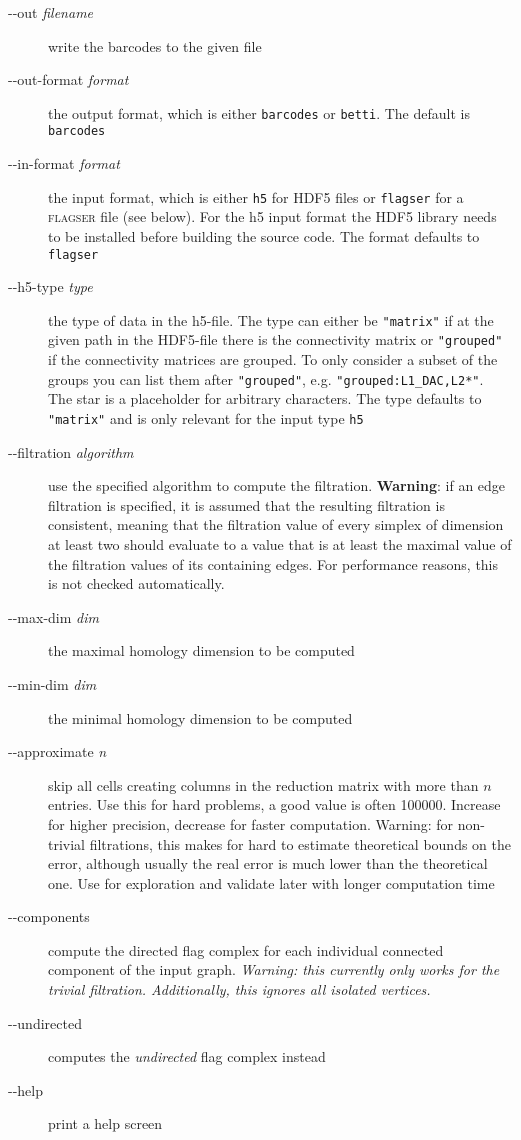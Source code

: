\documentclass{amsart}
\theoremstyle{definition}
\begin{document}
\enlargethispage{\baselineskip}
\begin{description}
  \item [-{}-out \textit{filename}] write the barcodes to the given file
  \item [-{}-out-format \textit{format}] the output format, which is either \texttt{barcodes} or
    \texttt{betti}. The default is \texttt{barcodes}
  \item [-{}-in-format \textit{format}] the input format, which is either \texttt{h5} for HDF5 files
    or \texttt{flagser} for a \textsc{flagser} file (see below). For the h5 input format the HDF5
    library needs to be installed before building the source code. The format defaults to
    \texttt{flagser}
  \item [-{}-h5-type \textit{type}] the type of data in the h5-file. The type can either be
    \texttt{"matrix"} if at the given path in the HDF5-file there is the connectivity matrix or \texttt{"grouped"}
    if the connectivity matrices are grouped. To only consider a subset of the groups you can list
    them after \texttt{"grouped"}, e.g. \texttt{"grouped:L1\_DAC,L2*"}. The star is a placeholder for
    arbitrary characters. The type defaults to \texttt{"matrix"} and is only relevant for the input
    type \texttt{h5}
  \item [-{}-filtration \textit{algorithm}] use the specified algorithm to compute the filtration. \textbf{Warning}:
  if an edge filtration is specified, it is assumed that the resulting filtration is consistent, meaning that the
  filtration value of every simplex of dimension at least two should evaluate to a value that is at least the
  maximal value of the filtration values of its containing edges. For performance reasons, this is not checked
  automatically.
  \item [-{}-max-dim \textit{dim}] the maximal homology dimension to be computed
  \item [-{}-min-dim \textit{dim}] the minimal homology dimension to be computed
  \item [-{}-approximate \textit{n}] skip all cells creating columns in the reduction matrix with
    more than $n$ entries. Use this for hard problems, a good value is often 100000. Increase for
    higher precision, decrease for faster computation. Warning: for non-trivial filtrations, this
    makes for hard to estimate theoretical bounds on the error, although usually the real error is
    much lower than the theoretical one. Use for exploration and validate later with longer computation
    time
  \item [-{}-components] compute the directed flag complex for each individual connected
    component of the input graph. \emph{Warning: this currently only works for the trivial
    filtration. Additionally, this ignores all isolated vertices.}
  \item [-{}-undirected] computes the \emph{undirected} flag complex instead
  \item [-{}-help] print a help screen
\end{description}
\end{document}
